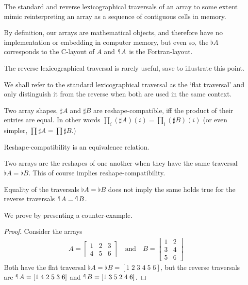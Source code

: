 \documentclass{DIKU-report-variant}
\newcommand\tlaf{\mathop{\rotatebox[origin=c]{180}{$\flat$}}}
\begin{document}
\begin{observation}
  \label{ob:c-fortran-order}
  The standard and reverse lexicographical traversals of an array to some extent
  mimic reinterpreting an array as a sequence of contiguous cells in memory.

  By definition, our arrays are mathematical objects, and therefore have no
  implementation or embedding in computer memory, but even so, the \(\flat A\)
  corresponds to the C-layout of \(A\) and \(\tlaf A\) is the Fortran-layout.

  The reverse lexicographical traversal is rarely useful, save to illustrate
  this point.
\end{observation}

\begin{remark}
  We shall refer to the standard lexicographical traversal as the `flat traversal'
  and only distinguish it from the reverse when both are used in the same
  context.
\end{remark}


\begin{definition}
  \label{def:reshape-comp} 
  Two array shapes, \(\sharp A\) and \(\sharp B\) are reshape-compatible, iff the product
  of their entries are equal. In other words
  \(\prod_{i} (\sharp A)(i) = \prod_{i} (\sharp B)(i)\) (or even simpler,
  \(\prod \sharp A = \prod \sharp B\).)

  Reshape-compatibility is an equivalence relation.
\end{definition}

\begin{definition}
  \label{def:reshape-equiv}
  Two arrays are the reshapes of one another when they have the same traversal
  \(\flat A = \flat B\). This of course implies reshape-compatibility.
\end{definition}

\begin{theorem}
  Equality of the traversals
  \(\flat A = \flat B\) does not imply the same holds true
  for the reverse traversals \(\tlaf A = \tlaf B\).

  We prove by presenting a counter-example.
\end{theorem}
\begin{proof}
  Consider the arrays
  \begin{align*}
    A =
    \begin{bmatrix}
      1 & 2 & 3 \\
      4 & 5 & 6
    \end{bmatrix}
    \quad\text{and}\quad
    B =
    \begin{bmatrix}
      1 & 2 \\
      3 & 4 \\
      5 & 6
    \end{bmatrix}
  \end{align*}
  Both have the flat traversal \(\flat A = \flat B = [1\; 2\; 3\; 4\; 5\; 6]\),
  but the reverse traversals are \(\tlaf A = [1\; 4\; 2\; 5\; 3\; 6]\) and
  \(\tlaf B = [1\; 3\; 5\; 2\; 4\; 6]\).
\end{proof}
\end{document}
